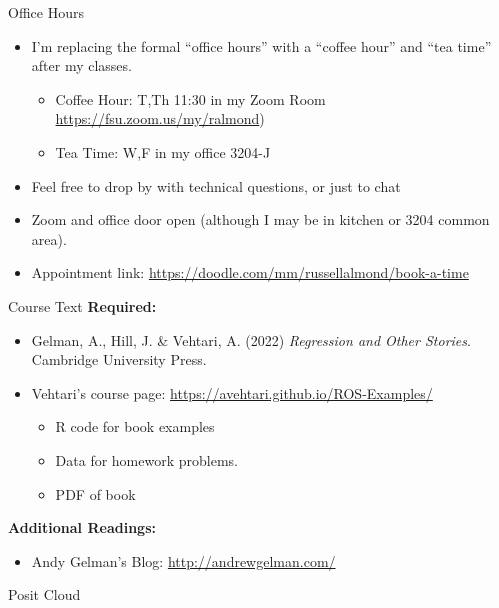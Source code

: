 \documentclass[
  ignorenonframetext,
]{beamer}
\providecommand{\tightlist}{%
  \setlength{\itemsep}{0pt}\setlength{\parskip}{0pt}}
\begin{document}
\begin{frame}{Office Hours}
\protect\hypertarget{office-hours}{}
\begin{itemize}
\tightlist
\item
  I'm replacing the formal ``office hours'' with a ``coffee hour'' and
  ``tea time'' after my classes.

  \begin{itemize}
  \tightlist
  \item
    Coffee Hour: T,Th 11:30 in my Zoom Room
    \url{https://fsu.zoom.us/my/ralmond})
  \item
    Tea Time: W,F in my office 3204-J
  \end{itemize}
\item
  Feel free to drop by with technical questions, or just to chat
\item
  Zoom and office door open (although I may be in kitchen or 3204 common
  area).
\item
  Appointment link:
  \url{https://doodle.com/mm/russellalmond/book-a-time}
\end{itemize}
\end{frame}

\begin{frame}{Course Text}
\protect\hypertarget{course-text}{}
\textbf{Required:}

\begin{itemize}
\item
  Gelman, A., Hill, J. \& Vehtari, A. (2022) \emph{Regression and Other
  Stories}. Cambridge University Press.
\item
  Vehtari's course page: \url{https://avehtari.github.io/ROS-Examples/}

  \begin{itemize}
  \tightlist
  \item
    R code for book examples
  \item
    Data for homework problems.
  \item
    PDF of book
  \end{itemize}
\end{itemize}

\textbf{Additional Readings:}

\begin{itemize}
\tightlist
\item
  Andy Gelman's Blog: \url{http://andrewgelman.com/}
\end{itemize}
\end{frame}

\begin{frame}{Posit Cloud}
\protect\hypertarget{posit-cloud}{}
\end{frame}
\end{document}

